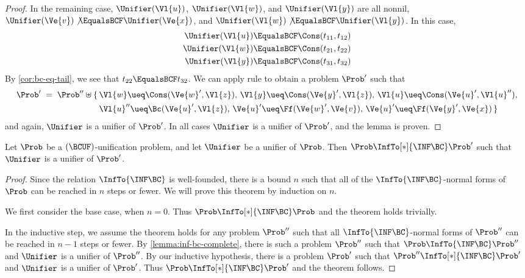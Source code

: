 \begin{proof}
    In the remaining case, $\Unifier(\Vl{u})$, $\Unifier(\Vl{w})$, and
    $\Unifier(\Vl{y})$ are all nonnil, $\Unifier(\Ve{v}) \not\EqualsBCF
    \Unifier(\Ve{x})$, and $\Unifier(\Vl{w}) \not\EqualsBCF \Unifier(\Vl{y})$.
    In this case,
    \begin{align*}
        \Unifier(\Vl{u}) &\EqualsBCF \Cons(t_{11}, t_{12}) \\
        \Unifier(\Vl{w}) &\EqualsBCF \Cons(t_{21}, t_{22}) \\
        \Unifier(\Vl{y}) &\EqualsBCF \Cons(t_{31}, t_{32})
    \end{align*}
    By \cref{cor:bc-eq-tail}, we see that $t_{22} \EqualsBCF t_{32}$. We can
    apply rule  to obtain a problem $\Prob'$ such that
    \begin{align*} \Prob' \; = \; \Prob'' \uplus \{ \,
        &\Vl{w} \ueq \Cons(\Ve{w}', \Vl{z}), \,
        \Vl{y} \ueq \Cons(\Ve{y}', \Vl{z}), \,
        \Vl{u} \ueq \Cons(\Ve{u}', \Vl{u}''), \\
        &\Vl{u}'' \ueq \Bc(\Ve{u}', \Vl{z}), \,
        \Ve{u}' \ueq \Ff(\Ve{w}', \Ve{v}), \,
        \Ve{u}' \ueq \Ff(\Ve{y}', \Ve{x})
        \, \}
    \end{align*}
    and again, $\Unifier$ is a unifier of $\Prob'$. In all cases $\Unifier$ is
    a unifier of $\Prob'$, and the lemma is proven.
\end{proof}

\begin{Theorem}\label{thm:inf-bc-complete}
    Let $\Prob$ be a $(\BCUF)$-unification problem, and let $\Unifier$ be a
    unifier of $\Prob$. Then $\Prob \InfTo[*]{\INF\BC} \Prob'$ such that
    $\Unifier$ is a unifier of $\Prob'$.
\end{Theorem}

\begin{proof}
    Since the relation $\InfTo{\INF\BC}$ is well-founded, there is a bound $n$
    such that all of the $\InfTo{\INF\BC}$-normal forms of $\Prob$ can be
    reached in $n$ steps or fewer. We will prove this theorem by induction on
    $n$.

    We first consider the base case, when $n = 0$. Thus $\Prob
    \InfTo[*]{\INF\BC} \Prob$ and the theorem holds trivially.

    In the inductive step, we assume the theorem holds for any problem
    $\Prob''$ such that all $\InfTo{\INF\BC}$-normal forms of $\Prob''$ can be
    reached in $n - 1$ steps or fewer. By \cref{lemma:inf-bc-complete}, there
    is such a problem $\Prob''$ such that $\Prob \InfTo{\INF\BC} \Prob''$ and
    $\Unifier$ is a unifier of $\Prob''$. By our inductive hypothesis, there is
    a problem $\Prob'$ such that $\Prob'' \InfTo[*]{\INF\BC} \Prob'$ and
    $\Unifier$ is a unifier of $\Prob'$. Thus $\Prob \InfTo[*]{\INF\BC} \Prob'$
    and the theorem follows.
\end{proof}

